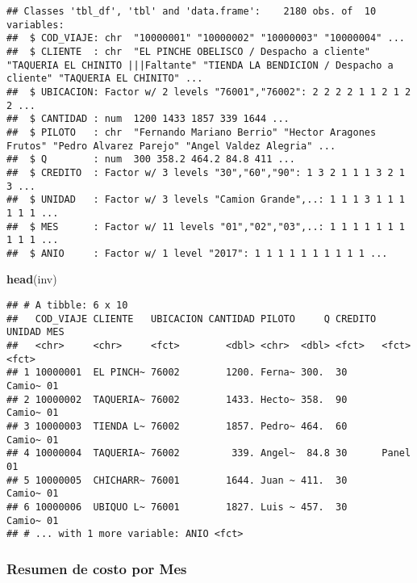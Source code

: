 \documentclass[]{article}
\newenvironment{Shaded}{\begin{snugshade}}{\end{snugshade}}
\newcommand{\KeywordTok}[1]{\textcolor[rgb]{0.13,0.29,0.53}{\textbf{#1}}}
\newcommand{\DataTypeTok}[1]{\textcolor[rgb]{0.13,0.29,0.53}{#1}}
\newcommand{\StringTok}[1]{\textcolor[rgb]{0.31,0.60,0.02}{#1}}
\newcommand{\OperatorTok}[1]{\textcolor[rgb]{0.81,0.36,0.00}{\textbf{#1}}}
\newcommand{\NormalTok}[1]{#1}
\begin{document}
\begin{verbatim}
## Classes 'tbl_df', 'tbl' and 'data.frame':    2180 obs. of  10 variables:
##  $ COD_VIAJE: chr  "10000001" "10000002" "10000003" "10000004" ...
##  $ CLIENTE  : chr  "EL PINCHE OBELISCO / Despacho a cliente" "TAQUERIA EL CHINITO |||Faltante" "TIENDA LA BENDICION / Despacho a cliente" "TAQUERIA EL CHINITO" ...
##  $ UBICACION: Factor w/ 2 levels "76001","76002": 2 2 2 2 1 1 2 1 2 2 ...
##  $ CANTIDAD : num  1200 1433 1857 339 1644 ...
##  $ PILOTO   : chr  "Fernando Mariano Berrio" "Hector Aragones Frutos" "Pedro Alvarez Parejo" "Angel Valdez Alegria" ...
##  $ Q        : num  300 358.2 464.2 84.8 411 ...
##  $ CREDITO  : Factor w/ 3 levels "30","60","90": 1 3 2 1 1 1 3 2 1 3 ...
##  $ UNIDAD   : Factor w/ 3 levels "Camion Grande",..: 1 1 1 3 1 1 1 1 1 1 ...
##  $ MES      : Factor w/ 11 levels "01","02","03",..: 1 1 1 1 1 1 1 1 1 1 ...
##  $ ANIO     : Factor w/ 1 level "2017": 1 1 1 1 1 1 1 1 1 1 ...
\end{verbatim}

\begin{Shaded}
\begin{Highlighting}[]
\KeywordTok{head}\NormalTok{(inv)}
\end{Highlighting}
\end{Shaded}

\begin{verbatim}
## # A tibble: 6 x 10
##   COD_VIAJE CLIENTE   UBICACION CANTIDAD PILOTO     Q CREDITO UNIDAD MES  
##   <chr>     <chr>     <fct>        <dbl> <chr>  <dbl> <fct>   <fct>  <fct>
## 1 10000001  EL PINCH~ 76002        1200. Ferna~ 300.  30      Camio~ 01   
## 2 10000002  TAQUERIA~ 76002        1433. Hecto~ 358.  90      Camio~ 01   
## 3 10000003  TIENDA L~ 76002        1857. Pedro~ 464.  60      Camio~ 01   
## 4 10000004  TAQUERIA~ 76002         339. Angel~  84.8 30      Panel  01   
## 5 10000005  CHICHARR~ 76001        1644. Juan ~ 411.  30      Camio~ 01   
## 6 10000006  UBIQUO L~ 76001        1827. Luis ~ 457.  30      Camio~ 01   
## # ... with 1 more variable: ANIO <fct>
\end{verbatim}

\subsubsection{Resumen de costo por Mes}\label{resumen-de-costo-por-mes}

\begin{Shaded}
\end{Shaded}
\end{document}
